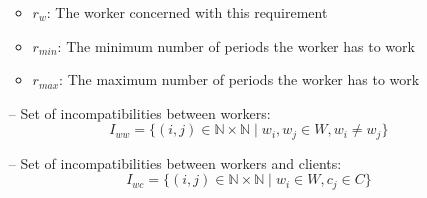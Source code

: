 \documentclass[../../thesis.tex]{subfiles}
\begin{document}
\begin{itemize}
  \begin{itemize}
    \item $r_{w}$: The worker concerned with this requirement
    \item$r_{min}$: The minimum number of periods the worker has to work 
    \item $r_{max}$: The maximum number of periods the worker has to work
  \end{itemize} 
  
  \item[--] Set of incompatibilities between workers:
  \begin{equation*}
      {I_{ww} = \{ ({i},{j}) \in \mathbb{N} \times \mathbb{N} \mid w_i, w_j \in W, w_i \neq w_j \}}
  \end{equation*}

  \item[--] Set of incompatibilities between workers and clients:
  \begin{equation*}
      I_{wc} = \{ (i, j) \in \mathbb{N} \times \mathbb{N} \mid w_i \in W, c_j \in C \}
  \end{equation*}
\end{itemize}  
\end{document}
